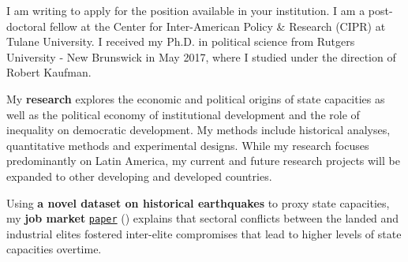 \documentclass[10pt,stdletter,dateno,sigleft]{newlfm} %
\begin{document}
\begin{newlfm}


\vspace{-0.3cm}I am writing to apply for the position available in your institution. I am a post-doctoral fellow at the Center for Inter-American Policy \& Research (CIPR) at Tulane University. I received my Ph.D. in political science from Rutgers University - New Brunswick in May 2017, where I studied under the direction of Robert Kaufman.

My {\bf research} explores the economic and political origins of state capacities as well as the political economy of institutional development and the role of inequality on democratic development. My methods include historical analyses, quantitative methods and experimental designs. While my research focuses predominantly on Latin America, my current and future research projects will be expanded to other developing and developed countries. 


Using {\bf a novel dataset on historical earthquakes} to proxy state capacities, my {\bf job market} \href{https://github.com/hbahamonde/Earthquake_Paper/raw/master/Bahamonde_Earthquake_Paper.pdf}{\texttt{paper}} (\emph{\unskip}) explains that sectoral conflicts between the landed and industrial elites fostered inter-elite compromises that lead to higher levels of state capacities overtime. 


\end{newlfm}
\end{document}

